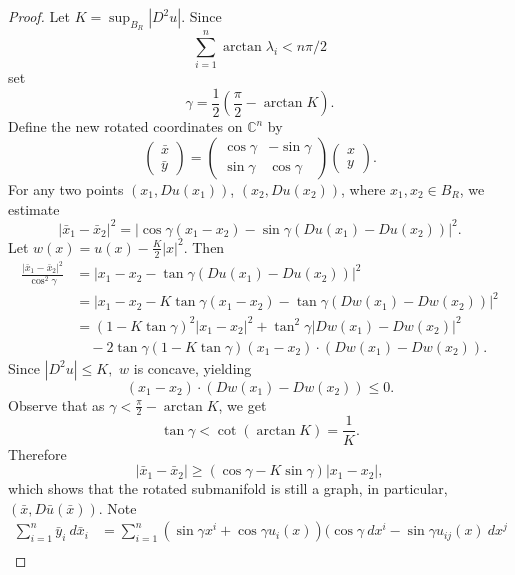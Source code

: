 \documentclass[12pt,reqno]{amsart}%
\theoremstyle{plain}
\numberwithin{equation}{section}
\theoremstyle{definition}
\theoremstyle{remark}
\newcommand{\C}{\mathbb{C}}
\begin{document}
 

\begin{proof} Let $K = \sup_{B_R} |D^2 u |$. Since 
\[
\sum_{i=1}^n \arctan \lambda_i<n\pi/2
\]
set \[\gamma = \frac{ 1}{ 2 } ( \frac{ \pi } 2  - \arctan K ). \] 
Define the new rotated coordinates on $\C^n$ by 
$$ \begin{pmatrix} 
\bar x \\ \bar y 
\end{pmatrix} 
= 
\begin{pmatrix} 
\cos \gamma & - \sin \gamma 
\\ \sin \gamma &\cos \gamma  
\end{pmatrix} 
\begin{pmatrix} 
x \\ y
\end{pmatrix}. $$
For any two points $(x_1, D u ( x_1) ) $, $ (x_2, D u ( x_2) )$, where $x_1,x_2\in B_R$, we estimate 
$$ | \bar x_1  - \bar x_2 | ^2  = | \cos \gamma ( x_1  - x_2 ) - \sin \gamma ( D u ( x_1) - D u ( x_2 ) )|^2 .$$
Let $w(x) = u(x) - \frac K 2 | x|^2 $. Then 
\begin{equation*} 
\begin{aligned} 
\frac{ | \bar x_1 - \bar x_2  |^2 }{ \cos^2 \gamma }  
& = | x_1 - x_2 - \tan \gamma ( D u ( x_1) - D u ( x_2 ) ) |^2 \\
& = | x_1 - x_2- K \tan \gamma ( x_1 - x_2 )  - \tan \gamma ( D w ( x_1) - D w ( x_2 ) ) |^2\\
& = ( 1 - K \tan \gamma )^2 |x_1-x_2|^2 + \tan ^2 \gamma | D w ( x_1) - D w ( x_2)|^2 \\
& \quad -2 \tan \gamma ( 1 - K \tan \gamma ) ( x_1 - x_2 ) \cdot ( D w ( x_1 ) - D w ( x_2)) .
\end{aligned} 
\end{equation*} 
Since $|D^2 u |\leq K, $ $w$ is concave, yielding \[( x_1 - x_2 ) \cdot ( D w ( x_1 ) - D w ( x_2))  \leq 0.\]
Observe that as $\gamma < \frac \pi 2 - \arctan K $, we get  \[\tan \gamma < \cot ( \arctan K ) = \frac 1 K .\] Therefore 
\begin{equation}
    | \bar x_1 - \bar x_2 | \geq (\cos \gamma - K \sin \gamma )| x_1 - x_2| \label{lambda},
 \end{equation}
which shows that the rotated submanifold is still a graph, in particular, $(\bar x, D \bar u (\bar x))$. Note
\begin{equation*} 
\begin{aligned}
    \sum_{i=1}^n \bar y_i \: d\bar x_i &= \sum_{i=1}^n (\sin \gamma x^i +\cos \gamma u_i(x))(\cos \gamma \: dx^i-\sin\gamma u_{ij}(x)\: dx^j\\

\end{aligned}
\end{equation*}
\end{proof}
\end{document}
